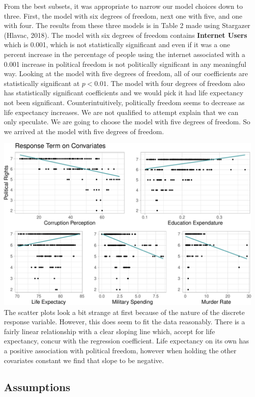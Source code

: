 \documentclass[
  english,
  man,floatsintext]{apa6}
\begin{document}
From the best subsets, it was appropriate to narrow our model choices down to three. First, the model with six degrees of freedom, next one with five, and one with four. The results from these three models is in Table 2 made using Stargazer (Hlavac, 2018). The model with six degrees of freedom contains \textbf{Internet Users} which is 0.001, which is not statistically significant and even if it was a one percent increase in the percentage of people using the internet associated with a 0.001 increase in political freedom is not politically significant in any meaningful way. Looking at the model with five degrees of freedom, all of our coefficients are statistically significant at \(p < 0.01\). The model with four degrees of freedom also has statistically significant coefficients and we would pick it had life expectancy not been significant. Counterintuitively, politically freedom seems to decrease as life expectancy increases. We are not qualified to attempt explain that we can only speculate. We are going to choose the model with five degrees of freedom. So we arrived at the model with five degrees of freedom.

\includegraphics{paper_files/figure-latex/unnamed-chunk-5-1.pdf}
The scatter plots look a bit strange at first because of the nature of the discrete response variable. However, this does seem to fit the data reasonably. There is a fairly linear relationship with a clear sloping line which, accept for life expectancy, concur with the regression coefficient. Life expectancy on its own has a positive association with political freedom, however when holding the other covariates constant we find that slope to be negative.

\hypertarget{assumptions}{%
\subsection{Assumptions}\label{assumptions}}
\end{document}
